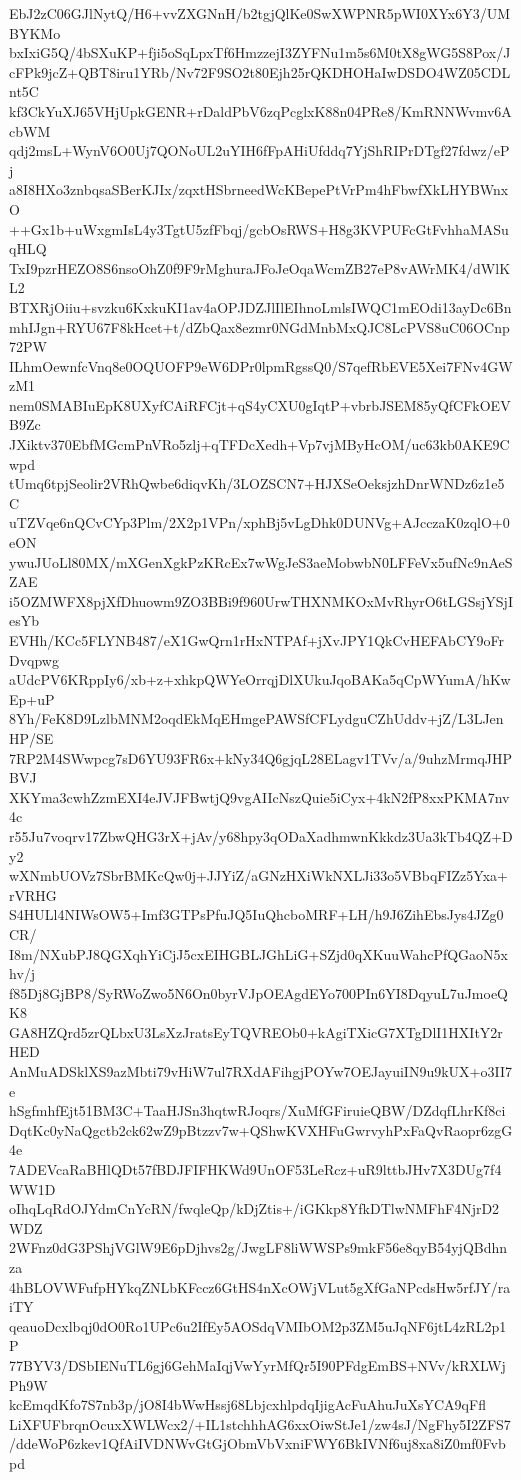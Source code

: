 EbJ2zC06GJlNytQ/H6+vvZXGNnH/b2tgjQlKe0SwXWPNR5pWI0XYx6Y3/UMBYKMo
bxIxiG5Q/4bSXuKP+fji5oSqLpxTf6HmzzejI3ZYFNu1m5s6M0tX8gWG5S8Pox/J
cFPk9jcZ+QBT8iru1YRb/Nv72F9SO2t80Ejh25rQKDHOHaIwDSDO4WZ05CDLnt5C
kf3CkYuXJ65VHjUpkGENR+rDaldPbV6zqPcglxK88n04PRe8/KmRNNWvmv6AcbWM
qdj2msL+WynV6O0Uj7QONoUL2uYIH6fFpAHiUfddq7YjShRIPrDTgf27fdwz/ePj
a8I8HXo3znbqsaSBerKJIx/zqxtHSbrneedWcKBepePtVrPm4hFbwfXkLHYBWnxO
++Gx1b+uWxgmIsL4y3TgtU5zfFbqj/gcbOsRWS+H8g3KVPUFcGtFvhhaMASuqHLQ
TxI9pzrHEZO8S6nsoOhZ0f9F9rMghuraJFoJeOqaWcmZB27eP8vAWrMK4/dWlKL2
BTXRjOiiu+svzku6KxkuKI1av4aOPJDZJlIlEIhnoLmlsIWQC1mEOdi13ayDc6Bn
mhIJgn+RYU67F8kHcet+t/dZbQax8ezmr0NGdMnbMxQJC8LcPVS8uC06OCnp72PW
ILhmOewnfcVnq8e0OQUOFP9eW6DPr0lpmRgssQ0/S7qefRbEVE5Xei7FNv4GWzM1
nem0SMABIuEpK8UXyfCAiRFCjt+qS4yCXU0gIqtP+vbrbJSEM85yQfCFkOEVB9Zc
JXiktv370EbfMGcmPnVRo5zlj+qTFDcXedh+Vp7vjMByHcOM/uc63kb0AKE9Cwpd
tUmq6tpjSeolir2VRhQwbe6diqvKh/3LOZSCN7+HJXSeOeksjzhDnrWNDz6z1e5C
uTZVqe6nQCvCYp3Plm/2X2p1VPn/xphBj5vLgDhk0DUNVg+AJcczaK0zqlO+0eON
ywuJUoLl80MX/mXGenXgkPzKRcEx7wWgJeS3aeMobwbN0LFFeVx5ufNc9nAeSZAE
i5OZMWFX8pjXfDhuowm9ZO3BBi9f960UrwTHXNMKOxMvRhyrO6tLGSsjYSjIesYb
EVHh/KCc5FLYNB487/eX1GwQrn1rHxNTPAf+jXvJPY1QkCvHEFAbCY9oFrDvqpwg
aUdcPV6KRppIy6/xb+z+xhkpQWYeOrrqjDlXUkuJqoBAKa5qCpWYumA/hKwEp+uP
8Yh/FeK8D9LzlbMNM2oqdEkMqEHmgePAWSfCFLydguCZhUddv+jZ/L3LJenHP/SE
7RP2M4SWwpcg7sD6YU93FR6x+kNy34Q6gjqL28ELagv1TVv/a/9uhzMrmqJHPBVJ
XKYma3cwhZzmEXI4eJVJFBwtjQ9vgAIIcNszQuie5iCyx+4kN2fP8xxPKMA7nv4c
r55Ju7voqrv17ZbwQHG3rX+jAv/y68hpy3qODaXadhmwnKkkdz3Ua3kTb4QZ+Dy2
wXNmbUOVz7SbrBMKcQw0j+JJYiZ/aGNzHXiWkNXLJi33o5VBbqFIZz5Yxa+rVRHG
S4HULl4NIWsOW5+Imf3GTPsPfuJQ5IuQhcboMRF+LH/h9J6ZihEbsJys4JZg0CR/
I8m/NXubPJ8QGXqhYiCjJ5cxEIHGBLJGhLiG+SZjd0qXKuuWahcPfQGaoN5xhv/j
f85Dj8GjBP8/SyRWoZwo5N6On0byrVJpOEAgdEYo700PIn6YI8DqyuL7uJmoeQK8
GA8HZQrd5zrQLbxU3LsXzJratsEyTQVREOb0+kAgiTXicG7XTgDlI1HXItY2rHED
AnMuADSklXS9azMbti79vHiW7ul7RXdAFihgjPOYw7OEJayuiIN9u9kUX+o3II7e
hSgfmhfEjt51BM3C+TaaHJSn3hqtwRJoqrs/XuMfGFiruieQBW/DZdqfLhrKf8ci
DqtKc0yNaQgctb2ck62wZ9pBtzzv7w+QShwKVXHFuGwrvyhPxFaQvRaopr6zgG4e
7ADEVcaRaBHlQDt57fBDJFIFHKWd9UnOF53LeRcz+uR9lttbJHv7X3DUg7f4WW1D
oIhqLqRdOJYdmCnYcRN/fwqleQp/kDjZtis+/iGKkp8YfkDTlwNMFhF4NjrD2WDZ
2WFnz0dG3PShjVGlW9E6pDjhvs2g/JwgLF8liWWSPs9mkF56e8qyB54yjQBdhnza
4hBLOVWFufpHYkqZNLbKFccz6GtHS4nXcOWjVLut5gXfGaNPcdsHw5rfJY/raiTY
qeauoDcxlbqj0dO0Ro1UPc6u2IfEy5AOSdqVMIbOM2p3ZM5uJqNF6jtL4zRL2p1P
77BYV3/DSbIENuTL6gj6GehMaIqjVwYyrMfQr5I90PFdgEmBS+NVv/kRXLWjPh9W
kcEmqdKfo7S7nb3p/jO8I4bWwHssj68LbjcxhlpdqIjigAcFuAhuJuXsYCA9qFfl
LiXFUFbrqnOcuxXWLWcx2/+IL1stchhhAG6xxOiwStJe1/zw4sJ/NgFhy5I2ZFS7
/ddeWoP6zkev1QfAiIVDNWvGtGjObmVbVxniFWY6BkIVNf6uj8xa8iZ0mf0Fvbpd
